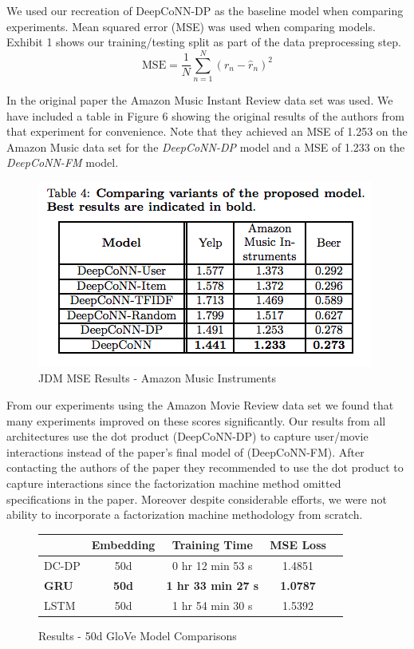 \documentclass[10pt, twocolumn, letterpaper]{article}
\begin{document}
We used our recreation of DeepCoNN-DP as the baseline model when comparing experiments. Mean squared error (MSE) was used when comparing models. Exhibit 1 shows our training/testing split as part of the data preprocessing step.
$$
\mbox{MSE} = \frac{1}{N}\sum_{n=1}^{N}(r_{n} - \hat{r}_{n})^2
$$

In the original paper the Amazon Music Instant Review data set was used. We have included a table in Figure 6 showing the original results of the authors from that experiment for convenience. Note that they achieved an MSE of 1.253 on the Amazon Music data set for the \textit{DeepCoNN-DP} model and a MSE of 1.233 on the \textit{DeepCoNN-FM} model.

\begin{figure}[!ht]
\begin{center}
\includegraphics[scale=0.50]{orig_mses.png}
\caption{JDM MSE Results - Amazon Music Instruments}
\end{center}
\end{figure}

From our experiments using the Amazon Movie Review data set we found that many experiments improved on these scores significantly. Our results from all architectures use the dot product  (DeepCoNN-DP)  to capture user/movie interactions instead of the paper's final model of (DeepCoNN-FM). After contacting the authors of the paper they recommended to use the dot product to capture interactions since the factorization machine method omitted specifications in the paper. Moreover despite considerable efforts, we were not ability to incorporate a factorization machine methodology from scratch.

\begin{figure}[!h]
\begin{center}
{\small
\begin{tabular}{l|cccc}
\hline
 & Embedding & Training Time & MSE Loss \\
\hline
DC-DP & 50d & 0 hr 12 min 53 s & 1.4851 \\
\textbf{GRU}& \textbf{50d}& \textbf{1 hr 33 min 27 s} & \textbf{1.0787} \\
LSTM & 50d & 1 hr 54 min 30 s & 1.5392 \\

\hline
\end{tabular}
}
\end{center}
\caption{Results - 50d GloVe Model Comparisons}
\end{figure}
\end{document}
